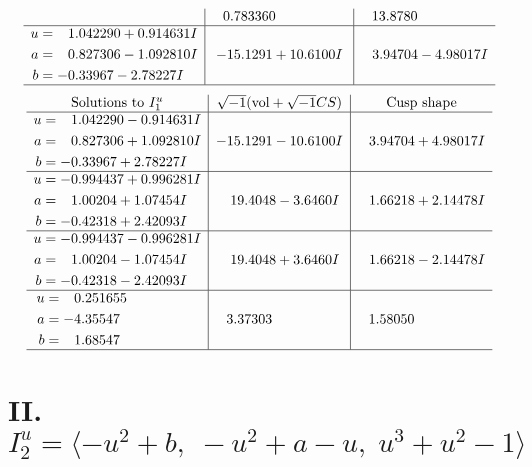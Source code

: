 \documentclass[1p]{elsarticle_modified}
\theoremstyle{definition}
\newcommand{\I}{\sqrt{-1}}
\begin{document}
$$\begin{array}{c|c|c}
 & \phantom{-}0.783360\phantom{ +0.000000I} & \phantom{-}13.8780\phantom{ +0.000000I} \\ \hline\begin{aligned}
u &= \phantom{-}1.042290 + 0.914631 I \\
a &= \phantom{-}0.827306 - 1.092810 I \\
b &= -0.33967 - 2.78227 I\end{aligned}
 & -15.1291 + 10.6100 I & \phantom{-}3.94704 - 4.98017 I\\
 \hline 
 \end{array}$$\newpage$$\begin{array}{c|c|c}  
\text{Solutions to }I^u_{1}& \I (\text{vol} + \sqrt{-1}CS) & \text{Cusp shape}\\
 \hline 
\begin{aligned}
u &= \phantom{-}1.042290 - 0.914631 I \\
a &= \phantom{-}0.827306 + 1.092810 I \\
b &= -0.33967 + 2.78227 I\end{aligned}
 & -15.1291 - 10.6100 I & \phantom{-}3.94704 + 4.98017 I \\ \hline\begin{aligned}
u &= -0.994437 + 0.996281 I \\
a &= \phantom{-}1.00204 + 1.07454 I \\
b &= -0.42318 + 2.42093 I\end{aligned}
 & \phantom{-}19.4048 - 3.6460 I & \phantom{-}1.66218 + 2.14478 I \\ \hline\begin{aligned}
u &= -0.994437 - 0.996281 I \\
a &= \phantom{-}1.00204 - 1.07454 I \\
b &= -0.42318 - 2.42093 I\end{aligned}
 & \phantom{-}19.4048 + 3.6460 I & \phantom{-}1.66218 - 2.14478 I \\ \hline\begin{aligned}
u &= \phantom{-}0.251655\phantom{ +0.000000I} \\
a &= -4.35547\phantom{ +0.000000I} \\
b &= \phantom{-}1.68547\phantom{ +0.000000I}\end{aligned}
 & \phantom{-}3.37303\phantom{ +0.000000I} & \phantom{-}1.58050\phantom{ +0.000000I}\\
 \hline 
 \end{array}$$\newpage\newpage\renewcommand{\arraystretch}{1}
\centering \section*{II. $I^u_{2}= \langle - u^2+b,\;- u^2+a- u,\;u^3+u^2-1 \rangle$}
\end{document}
